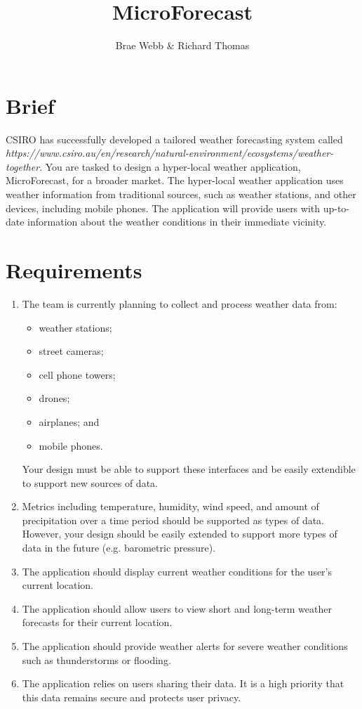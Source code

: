 \documentclass{csse4400}
\title{MicroForecast}
\author{Brae Webb \& Richard Thomas}
\date{\week[tutorial]{3}}
\begin{document}
\maketitle

\section{Brief}

CSIRO has successfully developed a tailored weather forecasting system called \emph{
{https://www.csiro.au/en/research/natural-environment/ecosystems/weather-together}}.
You are tasked to design a hyper-local weather application, MicroForecast, for a broader market.
The hyper-local weather application uses weather information from traditional sources, such as weather stations,
and other devices, including mobile phones.
The application will provide users with up-to-date information about the weather conditions in their immediate vicinity.

\section{Requirements}

\begin{enumerate}
    \item The team is currently planning to collect and process weather data from:
        \begin{itemize}
            \item weather stations;
            \item street cameras;
            \item cell phone towers;
            \item drones;
            \item airplanes; and
            \item mobile phones.
        \end{itemize}
        Your design must be able to support these interfaces and be easily extendible to support new sources of data.
    \item Metrics including temperature, humidity, wind speed, and amount of precipitation over a time period should be supported as types of data.
        However, your design should be easily extended to support more types of data in the future (e.g. barometric pressure).
    \item The application should display current weather conditions for the user's current location.
    \item The application should allow users to view short and long-term weather forecasts for their current location.
    \item The application should provide weather alerts for severe weather conditions such as thunderstorms or flooding.
    \item The application relies on users sharing their data. It is a high priority that this data remains secure and protects user privacy.
\end{enumerate}
\end{document}
